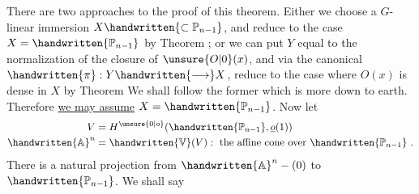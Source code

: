 There are two approaches to the proof of this theorem. Either we choose a $G$-linear immersion $X\handwritten{\subset\mathbb{P}_{n-1}}$, and reduce to the case $X=\handwritten{\mathbb{P}_{n-1}}$ by Theorem ; or we can put $Y$ equal to the normalization of the closure of $\unsure{O|0}(x)$, and via the canonical $\handwritten{\pi}:Y\handwritten{\longrightarrow}X$, reduce to the case where $O(x)$ is dense in $X$ by Theorem  We shall follow the former which is more down to earth. Therefore \uline{we may assume} $X=\handwritten{\mathbb{P}_{n-1}}$. Now let
\[
\begin{aligned}
V&=H^{\unsure{0|o}}(\handwritten{\mathbb{P}_{n-1}},\underline{o}(1))\\
\handwritten{\mathbb{A}}^{n}&=\handwritten{\mathbb{V}}(V):\text{ the affine cone over }\handwritten{\mathbb{P}_{n-1}}\ .
\end{aligned}
\]
There is a natural projection from $\handwritten{\mathbb{A}}^{n}-(0)$ to $\handwritten{\mathbb{P}_{n-1}}$. We shall say
